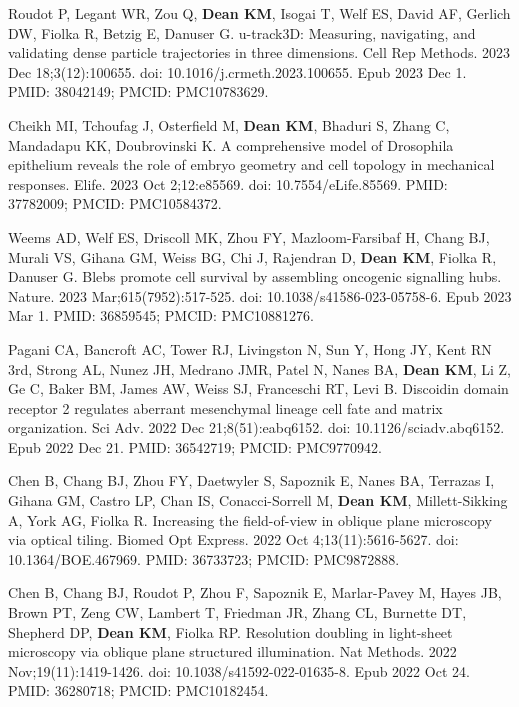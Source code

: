 \begin{etaremune}
\item Roudot P, Legant WR, Zou Q, \textbf{Dean KM}, Isogai T, Welf ES, David AF, Gerlich DW, Fiolka R, Betzig E, Danuser G. u-track3D: Measuring, navigating, and validating dense particle trajectories in three dimensions. Cell Rep Methods. 2023 Dec 18;3(12):100655. doi: 10.1016/j.crmeth.2023.100655. Epub 2023 Dec 1. PMID: 38042149; PMCID: PMC10783629.

\item Cheikh MI, Tchoufag J, Osterfield M, \textbf{Dean KM}, Bhaduri S, Zhang C, Mandadapu KK, Doubrovinski K. A comprehensive model of Drosophila epithelium reveals the role of embryo geometry and cell topology in mechanical responses. Elife. 2023 Oct 2;12:e85569. doi: 10.7554/eLife.85569. PMID: 37782009; PMCID: PMC10584372.

\item Weems AD, Welf ES, Driscoll MK, Zhou FY, Mazloom-Farsibaf H, Chang BJ, Murali VS, Gihana GM, Weiss BG, Chi J, Rajendran D, \textbf{Dean KM}, Fiolka R, Danuser G. Blebs promote cell survival by assembling oncogenic signalling hubs. Nature. 2023 Mar;615(7952):517-525. doi: 10.1038/s41586-023-05758-6. Epub 2023 Mar 1. PMID: 36859545; PMCID: PMC10881276.

\item Pagani CA, Bancroft AC, Tower RJ, Livingston N, Sun Y, Hong JY, Kent RN 3rd, Strong AL, Nunez JH, Medrano JMR, Patel N, Nanes BA, \textbf{Dean KM}, Li Z, Ge C, Baker BM, James AW, Weiss SJ, Franceschi RT, Levi B. Discoidin domain receptor 2 regulates aberrant mesenchymal lineage cell fate and matrix organization. Sci Adv. 2022 Dec 21;8(51):eabq6152. doi: 10.1126/sciadv.abq6152. Epub 2022 Dec 21. PMID: 36542719; PMCID: PMC9770942.

\item Chen B, Chang BJ, Zhou FY, Daetwyler S, Sapoznik E, Nanes BA, Terrazas I, Gihana GM, Castro LP, Chan IS, Conacci-Sorrell M, \textbf{Dean KM}, Millett-Sikking A, York AG, Fiolka R. Increasing the field-of-view in oblique plane microscopy via optical tiling. Biomed Opt Express. 2022 Oct 4;13(11):5616-5627. doi: 10.1364/BOE.467969. PMID: 36733723; PMCID: PMC9872888.

\item Chen B, Chang BJ, Roudot P, Zhou F, Sapoznik E, Marlar-Pavey M, Hayes JB, Brown PT, Zeng CW, Lambert T, Friedman JR, Zhang CL, Burnette DT, Shepherd DP, \textbf{Dean KM}, Fiolka RP. Resolution doubling in light-sheet microscopy via oblique plane structured illumination. Nat Methods. 2022 Nov;19(11):1419-1426. doi: 10.1038/s41592-022-01635-8. Epub 2022 Oct 24. PMID: 36280718; PMCID: PMC10182454.


\end{etaremune}
